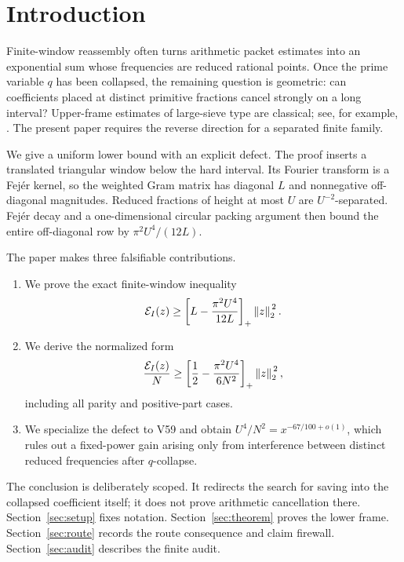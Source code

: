 \section{Introduction}

Finite-window reassembly often turns arithmetic packet estimates into an
exponential sum whose frequencies are reduced rational points.  Once the
prime variable \(q\) has been collapsed, the remaining question is geometric:
can coefficients placed at distinct primitive fractions cancel strongly on a
long interval?  Upper-frame estimates of large-sieve type are classical; see,
for example, \cite{montgomery1994ten}.  The present paper requires the reverse
direction for a separated finite family.

We give a uniform lower bound with an explicit defect.  The proof inserts a
translated triangular window below the hard interval.  Its Fourier transform
is a Fejér kernel, so the weighted Gram matrix has diagonal \(L\) and
nonnegative off-diagonal magnitudes.  Reduced fractions of height at most
\(U\) are \(U^{-2}\)-separated.  Fejér decay and a one-dimensional circular
packing argument then bound the entire off-diagonal row by
\(\pi^2U^4/(12L)\).

The paper makes three falsifiable contributions.

\begin{enumerate}[leftmargin=2.0em]
\item We prove the exact finite-window inequality
\[
\mathcal{E}_I(z)\geq
\left[L-\frac{\pi^2U^4}{12L}\right]_{+}\left\lVert z\right\rVert_{2}^{\,2}.
\]
\item We derive the normalized form
\[
\frac{\mathcal{E}_I(z)}{N}\geq
\left[\frac12-\frac{\pi^2U^4}{6N^2}\right]_{+}\left\lVert z\right\rVert_{2}^{\,2},
\]
including all parity and positive-part cases.
\item We specialize the defect to V59 and obtain
\(U^4/N^2=x^{-67/100+o(1)}\), which rules out a fixed-power gain arising
only from interference between distinct reduced frequencies after
\(q\)-collapse.
\end{enumerate}

The conclusion is deliberately scoped.  It redirects the search for saving
into the collapsed coefficient itself; it does not prove arithmetic
cancellation there.  Section~\ref{sec:setup} fixes notation.
Section~\ref{sec:theorem} proves the lower frame.
Section~\ref{sec:route} records the route consequence and claim firewall.
Section~\ref{sec:audit} describes the finite audit.
